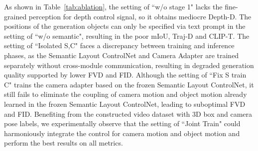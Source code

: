 As shown in Table~\ref{tab:ablation}, the setting of ``w/o stage 1" lacks the fine-grained perception for depth control signal, so it obtains mediocre Depth-D. The positions of the generation objects can only be specified via text prompt in the setting of ``w/o semantic", resulting in the poor mIoU, Traj-D and CLIP-T. The setting of ``Isolated S,C" faces a discrepancy between training and inference phases, as the Semantic Layout ControlNet and Camera Adapter are trained separately without cross-module communication, resulting in degraded generation quality supported by lower FVD and FID. Although the setting of ``Fix S train C" trains the camera adapter based on the frozen Semantic Layout ControlNet, it still fails to eliminate the coupling of camera motion and object motion already learned in the frozen Semantic Layout ControlNet, leading to suboptimal FVD and FID. 
Benefiting from the constructed video dataset with 3D box and camera pose labels, we experimentally observe that the setting of ``Joint Train" could harmoniously integrate the control for camera motion and object motion and perform the best results on all metrics.



